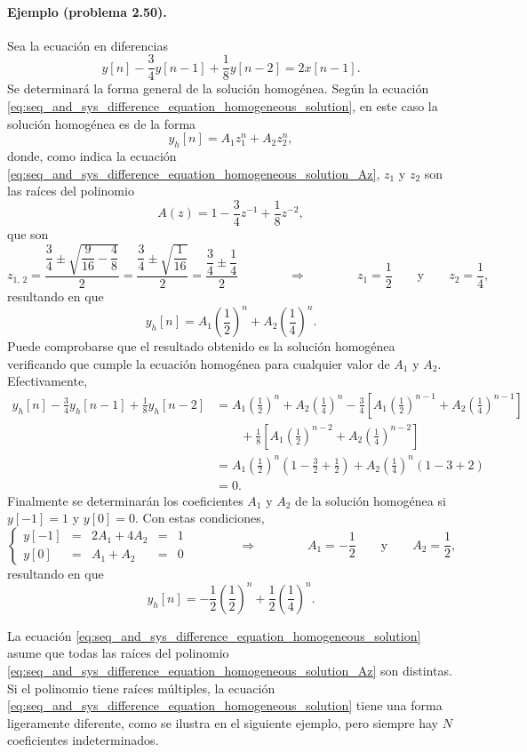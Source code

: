 \documentclass[a4paper]{report}
\begin{document}
\paragraph{Ejemplo (problema 2.50).} Sea la ecuación en diferencias
\[
 y[n]-\frac{3}{4}y[n-1]+\frac{1}{8}y[n-2]=2x[n-1].
\]
Se determinará la forma general de la solución homogénea. Según la ecuación \ref{eq:seq_and_sys_difference_equation_homogeneous_solution}, en este caso la solución homogénea es de la forma
\[
 y_h[n]=A_1z_1^n+A_2z_2^n,
\]
donde, como indica la ecuación \ref{eq:seq_and_sys_difference_equation_homogeneous_solution_Az}, \(z_1\) y \(z_2\) son las raíces del polinomio 
\[
 A(z)=1-\frac{3}{4}z^{-1}+\frac{1}{8}z^{-2},
\]
que son
\[
 z_{1,\,2}=\dfrac{\dfrac{3}{4}\pm\sqrt{\dfrac{9}{16}-\dfrac{4}{8}}}{2}
  =\dfrac{\dfrac{3}{4}\pm\sqrt{\dfrac{1}{16}}}{2}=\dfrac{\dfrac{3}{4}\pm\dfrac{1}{4}}{2}
\qquad\qquad\Rightarrow\qquad\qquad 
 z_1=\frac{1}{2}
 \qquad\textrm{y}\qquad
 z_2=\frac{1}{4},
\]
resultando en que 
\[
 y_h[n]=A_1\left(\frac{1}{2}\right)^n+A_2\left(\frac{1}{4}\right)^n.
\]
Puede comprobarse que el resultado obtenido es la solución homogénea verificando que cumple la ecuación homogénea para cualquier valor de \(A_1\) y \(A_2\). Efectivamente,
\begin{align*}
 y_h[n]-\frac{3}{4}y_h[n-1]+\frac{1}{8}y_h[n-2]&=A_1\left(\frac{1}{2}\right)^n+A_2\left(\frac{1}{4}\right)^n
  -\frac{3}{4}\left[A_1\left(\frac{1}{2}\right)^{n-1}+A_2\left(\frac{1}{4}\right)^{n-1}\right]\\
  &\qquad+\frac{1}{8}\left[A_1\left(\frac{1}{2}\right)^{n-2}+A_2\left(\frac{1}{4}\right)^{n-2}\right]\\
  &=A_1\left(\frac{1}{2}\right)^n\left(1-\frac{3}{2}+\frac{1}{2}\right)
   +A_2\left(\frac{1}{4}\right)^n\left(1-3+2\right)\\
  &=0.
\end{align*}
Finalmente se determinarán los coeficientes \(A_1\) y \(A_2\) de la solución homogénea si \(y[-1]=1\) y \(y[0]=0\). Con estas condiciones,
\[
 \left\{ 
 \begin{array}{lclclc}
  y[-1] & = & 2A_1+4A_2 & = & 1\\
  y[0] & = & A_1+A_2 & = & 0
 \end{array}
 \right.
 \qquad\qquad\Rightarrow\qquad\qquad
 A_1=-\frac{1}{2}
 \qquad\textrm{y}\qquad
 A_2=\frac{1}{2},
\]
resultando en que 
\[
 y_h[n]=-\frac{1}{2}\left(\frac{1}{2}\right)^n+\frac{1}{2}\left(\frac{1}{4}\right)^n.
\]

La ecuación \ref{eq:seq_and_sys_difference_equation_homogeneous_solution} asume que todas las raíces del polinomio \ref{eq:seq_and_sys_difference_equation_homogeneous_solution_Az} son distintas. Si el polinomio tiene raíces múltiples, la ecuación \ref{eq:seq_and_sys_difference_equation_homogeneous_solution} tiene una forma ligeramente diferente, como se ilustra en el siguiente ejemplo, pero siempre hay \(N\) coeficientes indeterminados.
  
\end{document}
